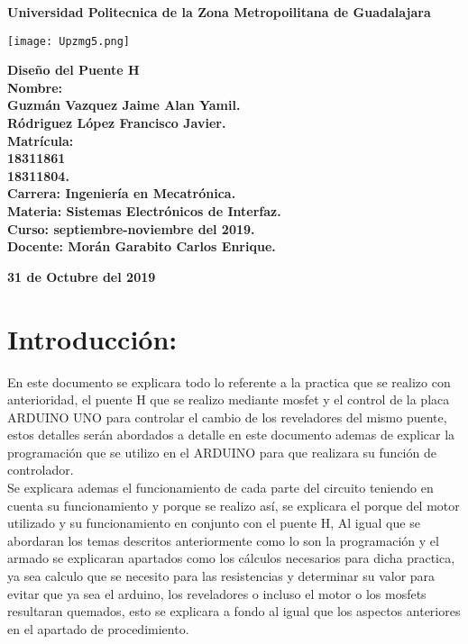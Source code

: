 \documentclass[12pt,a4paper]{article}
\author{Rodriguez Lopez Francisco Javier}
\begin{document}
\begin{center}
\LARGE \textbf{Universidad Politecnica de la Zona Metropoilitana de Guadalajara\\}


\texttt{[image: Upzmg5.png]} 

\large \textbf{Diseño del Puente H}\\
\vspace{1cm}
\large \textbf{Nombre:\\
Guzmán Vazquez Jaime Alan Yamil.\\
Ródriguez López Francisco Javier.\\
\vspace{0.5cm} Matrícula:\\
18311861\\
18311804.\\
\vspace{0.5cm} Carrera: Ingeniería en Mecatrónica.\\
\vspace{0.5cm} Materia: Sistemas Electrónicos de Interfaz.\\
\vspace{0.5cm} Curso: septiembre-noviembre del 2019.\\
\vspace{0.5cm} Docente: Morán Garabito Carlos Enrique.}


\vspace{4cm}
\small \textbf{31 de Octubre del 2019}
\end{center}


\section{Introducción:}
En este documento se explicara todo lo referente a la practica que se realizo con anterioridad, el puente H que se realizo mediante mosfet y el control de la placa ARDUINO UNO  para controlar el cambio de los reveladores del mismo puente, estos detalles serán abordados a detalle en este documento ademas de explicar la programación que se utilizo en el ARDUINO  para que  realizara su función de controlador.\\

Se explicara ademas el funcionamiento de cada parte del circuito teniendo en cuenta su funcionamiento y porque se realizo así, se explicara el porque del motor utilizado y su funcionamiento en conjunto con el puente H,
Al igual que se abordaran los temas descritos anteriormente como lo son la programación y el armado se  explicaran apartados como los cálculos necesarios para dicha practica, ya  sea calculo que se necesito para las resistencias y determinar su valor para evitar que ya sea el arduino, los reveladores o incluso el motor o los mosfets resultaran quemados, esto se explicara a fondo al igual que los aspectos anteriores en el apartado de procedimiento.\\
  
\end{document}
